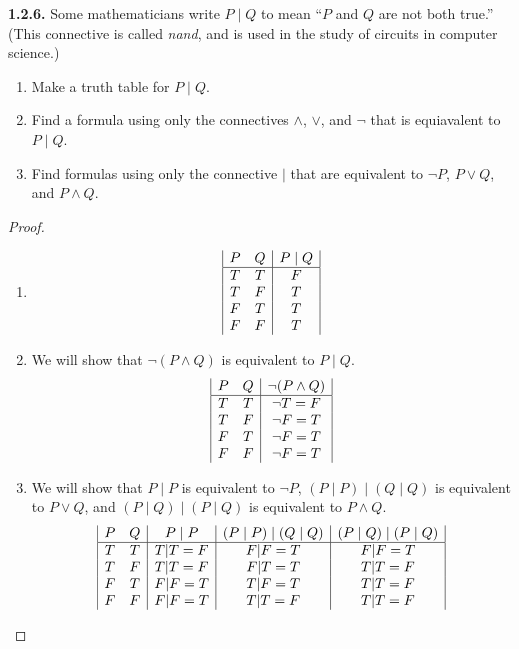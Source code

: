 \documentclass[12pt]{amsart}
\newenvironment{statement}[1]{\smallskip\noindent\color[rgb]{.6627, .3529, .6314} {\bf #1.}}{}
\theoremstyle{definition}
\theoremstyle{remark}
\begin{document}
\begin{statement}{1.2.6}
Some mathematicians write $P \mid Q$ to mean ``$P$ and $Q$ are not both true.''
(This connective is called \emph{nand}, and is used in the study of circuits in computer science.)
\begin{enumerate}
	\item Make a truth table for $P \mid Q$.
	\item Find a formula using only the connectives $\wedge$, $\vee$, and $\neg$ that is equiavalent to $P \mid Q$.
	\item Find formulas using only the connective $|$ that are equivalent to $\neg P$, $P \vee Q$, and $P \wedge Q$.
\end{enumerate}
\end{statement}

\begin{proof}
\hfill
\begin{enumerate}
	\item
	\begin{equation*}
		\begin{array}{| c c | c |}
			P & Q & P \mid Q \\
			\hline
			T & T & F \\
			T & F & T \\
			F & T & T \\
			F & F & T
		\end{array}
	\end{equation*}
	
	\item We will show that $\neg (P \wedge Q)$ is equivalent to $P \mid Q$.
	\begin{equation*}
		\begin{array}{| c c | c |}
			P & Q & \neg (P \wedge Q) \\
			\hline
			T & T & \neg T = F \\
			T & F & \neg F = T \\
			F & T & \neg F = T \\
			F & F & \neg F = T
		\end{array}
	\end{equation*}
	
	\item We will show that $P \mid P$ is equivalent to $\neg P$, $(P \mid P) \mid (Q \mid Q)$ is equivalent to $P \vee Q$, and $(P \mid Q) \mid (P \mid Q)$ is equivalent to $P \wedge Q$.
	\begin{equation*}
		\begin{array}{| c c | c | c | c |}
			P & Q & P \mid P & (P \mid P) \mid (Q \mid Q) & (P \mid Q) \mid (P \mid Q) \\
			\hline
			T & T & T | T = F & F | F = T & F | F = T \\
			T & F & T | T = F & F | T = T & T | T = F \\
			F & T & F | F = T & T | F = T & T | T = F \\
			F & F & F | F = T & T | T = F & T | T = F
		\end{array}
	\end{equation*}
\end{enumerate}
\end{proof}
\end{document}
